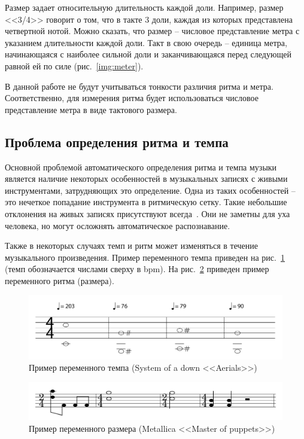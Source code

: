 \newpage

Размер задает относительную длительность каждой доли. Например, размер <<3/4>> говорит о том, что в такте 3 доли, каждая из которых представлена четвертной нотой. Можно сказать, что размер -- числовое представление метра с указанием длительности каждой доли. Такт в свою очередь -- единица метра, начинающаяся с наиболее сильной доли и заканчивающаяся перед следующей равной ей по силе (рис.~\ref{img:meter}).

В данной работе не будут учитываться тонкости различия ритма и метра. Соответственно, для измерения ритма будет использоваться числовое представление метра в виде тактового размера.

\subsection{Проблема определения ритма и темпа}

Основной проблемой автоматического определения ритма и темпа музыки является наличие некоторых особенностей в музыкальных записях с живыми инструментами, затрудняющих это определение. Одна из таких особенностей -- это нечеткое попадание инструмента в ритмическую сетку. Такие небольшие отклонения на живых записях присутствуют всегда~\cite{quantize}. Они не заметны для уха человека, но могут осложнять автоматическое распознавание.

Также в некоторых случаях темп и ритм может изменяться в течение музыкального произведения. Пример переменного темпа приведен на рис.~\ref{img:aerials} (темп обозначается числами сверху в bpm). На рис.~\ref{img:master} приведен пример переменного ритма (размера).

\begin{figure}[h]
	\centering
	\includegraphics[scale=0.5]{svg/aerials.pdf}
	\caption{Пример переменного темпа (System of a down <<Aerials>>)}
	\label{img:aerials}
\end{figure}

\begin{figure}[h]
	\centering
	\includegraphics[scale=0.5]{svg/master.pdf}
	\caption{Пример переменного размера (Metallica <<Master of puppets>>)}
	\label{img:master}
\end{figure}

